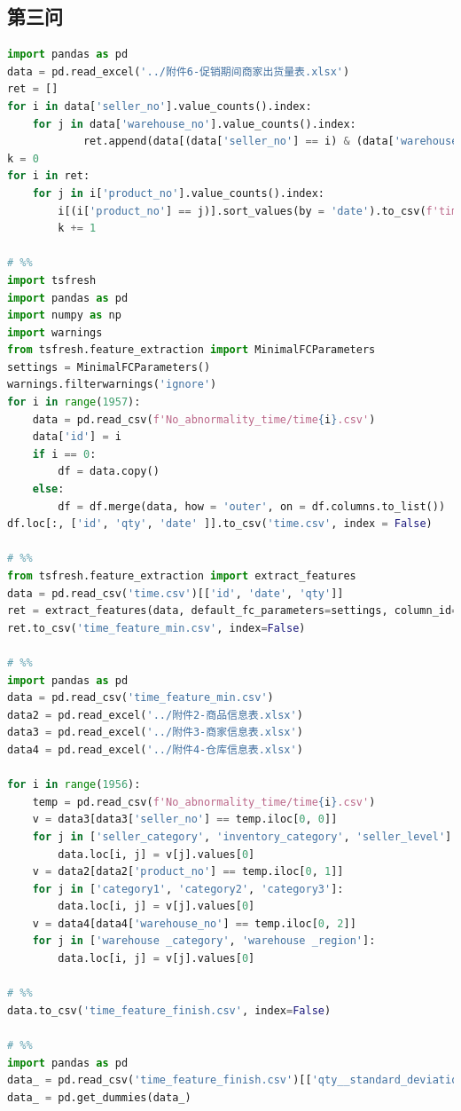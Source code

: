 \documentclass[withoutpreface,bwprint]{cumcmthesis}
\begin{document}
\subsection*{第三问}
\begin{lstlisting}[language=python]
 %%
import pandas as pd
data = pd.read_excel('../附件6-促销期间商家出货量表.xlsx')
ret = []
for i in data['seller_no'].value_counts().index:
    for j in data['warehouse_no'].value_counts().index:
            ret.append(data[(data['seller_no'] == i) & (data['warehouse_no'] == j)])
k = 0
for i in ret:
    for j in i['product_no'].value_counts().index:
        i[(i['product_no'] == j)].sort_values(by = 'date').to_csv(f'time/time{k}.csv', index = False)
        k += 1

# %%
import tsfresh
import pandas as pd
import numpy as np
import warnings 
from tsfresh.feature_extraction import MinimalFCParameters
settings = MinimalFCParameters()
warnings.filterwarnings('ignore')
for i in range(1957):
    data = pd.read_csv(f'No_abnormality_time/time{i}.csv')
    data['id'] = i
    if i == 0:
        df = data.copy()
    else:
        df = df.merge(data, how = 'outer', on = df.columns.to_list())
df.loc[:, ['id', 'qty', 'date' ]].to_csv('time.csv', index = False)

# %%
from tsfresh.feature_extraction import extract_features
data = pd.read_csv('time.csv')[['id', 'date', 'qty']]
ret = extract_features(data, default_fc_parameters=settings, column_id="id", column_sort="date")
ret.to_csv('time_feature_min.csv', index=False)

# %%
import pandas as pd
data = pd.read_csv('time_feature_min.csv')
data2 = pd.read_excel('../附件2-商品信息表.xlsx')
data3 = pd.read_excel('../附件3-商家信息表.xlsx')
data4 = pd.read_excel('../附件4-仓库信息表.xlsx')

for i in range(1956):
    temp = pd.read_csv(f'No_abnormality_time/time{i}.csv')
    v = data3[data3['seller_no'] == temp.iloc[0, 0]]
    for j in ['seller_category', 'inventory_category', 'seller_level']:
        data.loc[i, j] = v[j].values[0]
    v = data2[data2['product_no'] == temp.iloc[0, 1]]
    for j in ['category1', 'category2', 'category3']:
        data.loc[i, j] = v[j].values[0]
    v = data4[data4['warehouse_no'] == temp.iloc[0, 2]]
    for j in ['warehouse _category', 'warehouse _region']:
        data.loc[i, j] = v[j].values[0]

# %%
data.to_csv('time_feature_finish.csv', index=False)

# %%
import pandas as pd
data_ = pd.read_csv('time_feature_finish.csv')[['qty__standard_deviation', 'qty__mean', 'seller_level', 'warehouse _region', 'category1']]
data_ = pd.get_dummies(data_)


\end{lstlisting}
\end{document}
